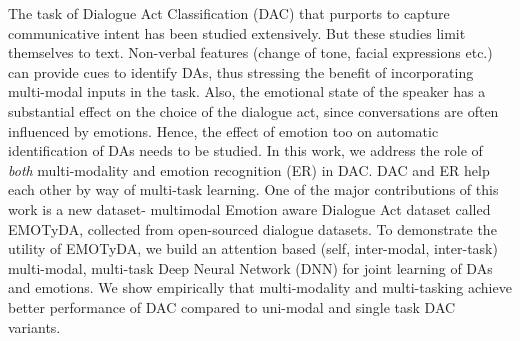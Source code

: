 The task of Dialogue Act Classification (DAC) that purports to capture communicative intent has been studied extensively. But these studies limit themselves to text. Non-verbal features (change of tone, facial expressions etc.) can provide cues to identify DAs, thus stressing the benefit of incorporating multi-modal inputs in the task. Also, the emotional state of the speaker has a substantial effect on the choice of the dialogue act, since conversations are often influenced by emotions. Hence, the effect of emotion too on automatic identification of DAs needs to be studied. In this work, we address the role of {\it both} multi-modality and emotion recognition (ER) in DAC. DAC and ER help each other by way of multi-task learning. One of the major contributions of this work is a new dataset- multimodal Emotion aware Dialogue Act dataset called EMOTyDA, collected from open-sourced dialogue datasets. To demonstrate the utility of EMOTyDA, we  build an attention based (self, inter-modal, inter-task) multi-modal, multi-task Deep Neural Network (DNN) for joint learning of DAs and emotions. We show empirically that multi-modality and multi-tasking achieve better performance of DAC compared to uni-modal and single task DAC variants.
